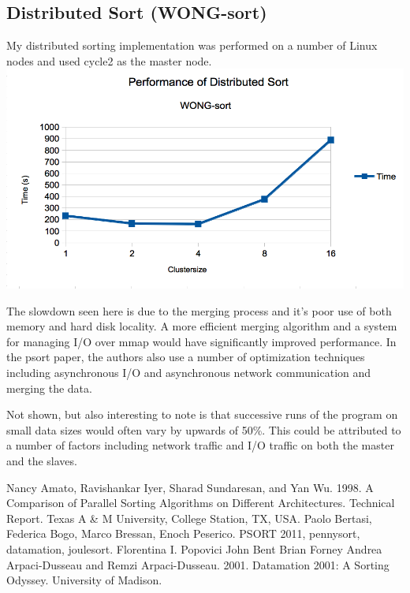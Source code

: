 \documentclass[11pt,letterpaper]{article}
\begin{document}
\subsection{Distributed Sort (WONG-sort)}
My distributed sorting implementation was performed on a number of Linux nodes
and used cycle2 as the master node.\\
\includegraphics[width=\textwidth]{wong-performance.png}

\par
The slowdown seen here is due to the merging process and it's poor use of both
memory and hard disk locality.  A more efficient merging algorithm and a system for managing I/O over mmap would have significantly improved performance.
In the psort \cite{psort} paper, the authors also use a number of 
optimization techniques including asynchronous I/O and asynchronous network
communication and merging the data.  
\par
Not shown, but also interesting to note is that successive runs of the program
on small data sizes would often vary by upwards of 50\%.  This could be attributed to a number of
factors including network traffic and I/O traffic on both the master and the
slaves.

\begin{thebibliography}{10}
	 Nancy Amato, Ravishankar Iyer, Sharad Sundaresan, and Yan Wu. 1998. A Comparison of Parallel Sorting Algorithms on Different Architectures. Technical Report. Texas A \& M University, College Station, TX, USA.
	 Paolo Bertasi, Federica Bogo, Marco Bressan, Enoch Peserico. PSORT 2011, pennysort, datamation, joulesort.
	 Florentina I. Popovici John Bent Brian Forney Andrea Arpaci-Dusseau and Remzi Arpaci-Dusseau. 2001. Datamation 2001: A Sorting Odyssey. University of Madison.
\end{thebibliography}
\end{document}
